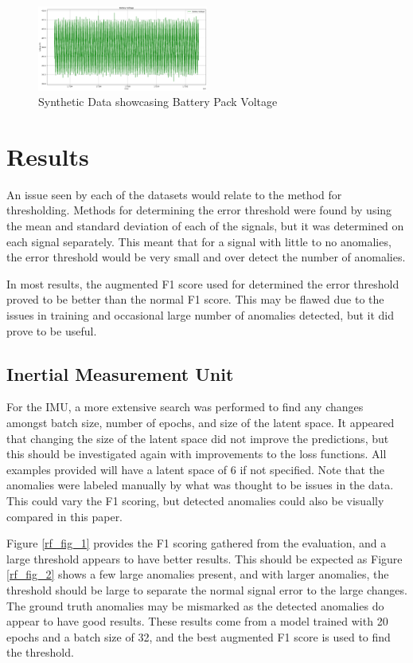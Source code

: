 \documentclass[conference]{IEEEtran}
\begin{document}
\begin{figure}[htbp]
    \centering
    \includegraphics[width=0.5\textwidth]{aj_fig_2.png}
    \caption{Synthetic Data showcasing Battery Pack Voltage}
    \label{aj_fig__2}
\end{figure}

\section{Results}
An issue seen by each of the datasets would relate to the method for thresholding. Methods for determining the error threshold were found by using the mean and standard deviation of each of the signals, but it was determined on each signal separately. This meant that for a signal with little to no anomalies, the error threshold would be very small and over detect the number of anomalies.

In most results, the augmented F1 score used for determined the error threshold proved to be better than the normal F1 score. This may be flawed due to the issues in training and occasional large number of anomalies detected, but it did prove to be useful. 

\subsection{Inertial Measurement Unit}
For the IMU, a more extensive search was performed to find any changes amongst batch size, number of epochs, and size of the latent space. It appeared that changing the size of the latent space did not improve the predictions, but this should be investigated again with improvements to the loss functions. All examples provided will have a latent space of 6 if not specified. Note that the anomalies were labeled manually by what was thought to be issues in the data. This could vary the F1 scoring, but detected anomalies could also be visually compared in this paper.

Figure \ref{rf_fig_1} provides the F1 scoring gathered from the evaluation, and a large threshold appears to have better results. This should be expected as Figure \ref{rf_fig_2} shows a few large anomalies present, and with larger anomalies, the threshold should be large to separate the normal signal error to the large changes. The ground truth anomalies may be mismarked as the detected anomalies do appear to have good results. These results come from a model trained with 20 epochs and a batch size of 32, and the best augmented F1 score is used to find the threshold.
\end{document}

